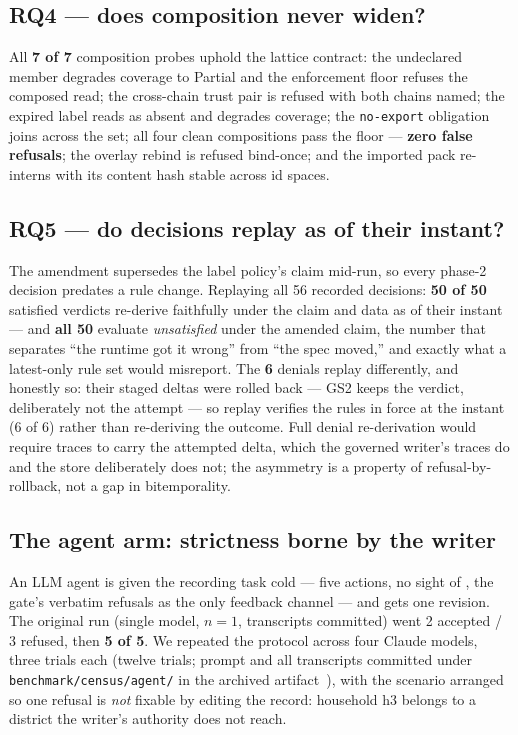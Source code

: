 \subsection{RQ4 --- does composition never widen?}
All \textbf{7 of 7} composition probes uphold the lattice contract:
the undeclared member degrades coverage to \textsf{Partial} and the
enforcement floor refuses the composed read; the cross-chain trust
pair is refused with both chains named; the expired label reads as
absent and degrades coverage; the \texttt{no-export} obligation joins
across the set; all four clean compositions pass the floor ---
\textbf{zero false refusals}; the overlay rebind is refused bind-once;
and the imported pack re-interns with its content hash stable across
id spaces.

\subsection{RQ5 --- do decisions replay as of their instant?}
\label{sec:eval-replay}
The amendment supersedes the label policy's claim mid-run, so every
phase-2 decision predates a rule change. Replaying all 56 recorded
decisions: \textbf{50 of 50} satisfied verdicts re-derive faithfully
under the claim and data as of their instant --- and \textbf{all 50}
evaluate \emph{unsatisfied} under the amended claim, the number that
separates ``the runtime got it wrong'' from ``the spec moved,'' and
exactly what a latest-only rule set would misreport. The
\textbf{6} denials replay differently, and honestly so: their staged
deltas were rolled back --- GS2 keeps the verdict, deliberately not the
attempt --- so replay verifies the rules in force at the instant
(6 of 6) rather than re-deriving the outcome. Full denial
re-derivation would require traces to carry the attempted delta,
which the governed writer's traces do and the store deliberately does
not; the asymmetry is a property of refusal-by-rollback, not a gap in
bitemporality.

\subsection{The agent arm: strictness borne by the writer}
\label{sec:eval-agent}
An LLM agent is given the recording task cold --- five actions, no
sight of \Sig, the gate's verbatim refusals as the only feedback
channel --- and gets one revision. The original run (single model,
$n{=}1$, transcripts committed) went 2 accepted / 3 refused, then
\textbf{5 of 5}. We repeated the protocol across four Claude models,
three trials each (twelve trials; prompt and all transcripts
committed under \texttt{benchmark/census/agent/} in the archived
artifact~\cite{brown2026quipu}), with the scenario
arranged so one refusal is \emph{not} fixable by editing the record:
household h3 belongs to a district the writer's authority does not
reach.

